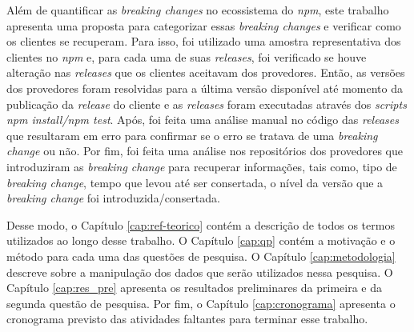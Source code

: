 Além de quantificar as \textit{breaking changes} no ecossistema do \textit{npm}, este trabalho apresenta uma proposta para categorizar essas \textit{breaking changes} e verificar como os clientes se recuperam. Para isso, foi utilizado uma amostra representativa dos clientes no \textit{npm} e, para cada uma de suas \textit{releases}, foi verificado se houve alteração nas \textit{releases} que os clientes aceitavam dos provedores. Então, as versões dos provedores foram resolvidas para a última versão disponível até momento da publicação da \textit{release} do cliente e as \textit{releases} foram executadas através dos \textit{scripts npm install/npm test}. Após, foi feita uma análise manual no código das \textit{releases} que resultaram em erro para confirmar se o erro se tratava de uma \textit{breaking change} ou não. Por fim, foi feita uma análise nos repositórios dos provedores que introduziram as \textit{breaking change} para recuperar informações, tais como, tipo de \textit{breaking change}, tempo que levou até ser consertada, o nível da versão que a \textit{breaking change} foi introduzida/consertada.

Desse modo, o Capítulo \ref{cap:ref-teorico} contém a descrição de todos os termos utilizados ao longo desse trabalho. O Capítulo \ref{cap:qp} contém a motivação e o método para cada uma das questões de pesquisa. O Capítulo \ref{cap:metodologia} descreve sobre a manipulação dos dados que serão  utilizados nessa pesquisa. O Capítulo \ref{cap:res_pre} apresenta os resultados preliminares da primeira e da segunda questão de pesquisa. Por fim, o Capítulo \ref{cap:cronograma} apresenta o cronograma previsto das atividades faltantes para terminar esse trabalho.


